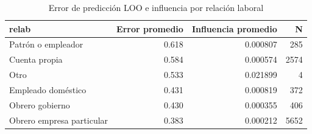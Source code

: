 \begin{table}[ht]
\centering
\begin{tabular}{lrrr}
  \toprule
relab & Error promedio & Influencia promedio & N \\ 
  \midrule
Patrón o empleador & 0.618 & 0.000807 & 285 \\ 
  Cuenta propia & 0.584 & 0.000574 & 2574 \\ 
  Otro & 0.533 & 0.021899 & 4 \\ 
  Empleado doméstico & 0.431 & 0.000819 & 372 \\ 
  Obrero gobierno & 0.430 & 0.000355 & 406 \\ 
  Obrero empresa particular & 0.383 & 0.000212 & 5652 \\ 
   \bottomrule
\end{tabular}
\caption{Error de predicción LOO e influencia por relación laboral} 
\label{tab:relab}
\end{table}
